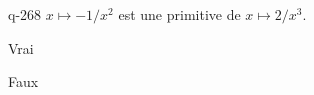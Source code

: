 \begin{truefalse}{q-268}
$x\mapsto -1/x^2$ est une primitive de $x\mapsto 2/x^3$.
\item* Vrai
\item Faux
\end{truefalse}

